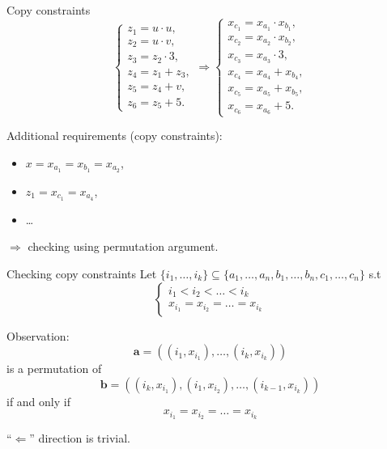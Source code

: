 \documentclass{beamer}
\begin{document}
	\begin{frame}{Copy constraints}
		\begin{equation*}
			\begin{cases}
				z_1 = u \cdot u,\\
				z_2 = u \cdot v,\\
				z_3 = z_2 \cdot 3,\\
				z_4 = z_1 + z_3,\\
				z_5 = z_4 + v,\\
				z_6 = z_5 + 5.
			\end{cases}\Rightarrow
			\begin{cases}
				x_{c_1} = x_{a_1} \cdot x_{b_1},\\
				x_{c_2} = x_{a_2} \cdot x_{b_2},\\
				x_{c_3} = x_{a_3} \cdot 3,\\
				x_{c_4} = x_{a_4} + x_{b_4},\\
				x_{c_5} = x_{a_5} + x_{b_5},\\
				x_{c_6} = x_{a_6} + 5.
			\end{cases}
		\end{equation*}
	
		Additional requirements (copy constraints):
		\begin{itemize}
			\item $x = x_{a_1} = x_{b_1} = x_{a_2}$,\\
			\item $z_1 = x_{c_1} = x_{a_4}$,\\
			\item \dots
		\end{itemize}
		$\Rightarrow$ checking using permutation argument.
	\end{frame}
	\begin{frame}{Checking copy constraints}
		Let $\{i_1, \dots, i_k\} \subseteq \{a_1, \dots, a_n, b_1, \dots, b_n, c_1, \dots, c_n\}$ s.t 
		\begin{equation*}
			\begin{cases}
				i_1 < i_2 < \dots < i_k \\
				x_{i_1} = x_{i_2} = \dots = x_{i_k}
			\end{cases}
		\end{equation*}
		
		Observation: 
		\begin{equation*}
			\mathbf{a} = \left((i_1, x_{i_1}), \dots, (i_k, x_{i_k})\right) 
		\end{equation*}
		is a permutation of 
		\begin{equation*}
			\mathbf{b} = \left((i_k, x_{i_1}), (i_1, x_{i_2}), \dots, (i_{k - 1}, x_{i_k})\right) 
		\end{equation*}
		if and only if 
		\begin{equation*}
			x_{i_1} = x_{i_2} = \dots = x_{i_k}
		\end{equation*}
	
		``$\Leftarrow$'' direction is trivial.
	\end{frame}
\end{document}
